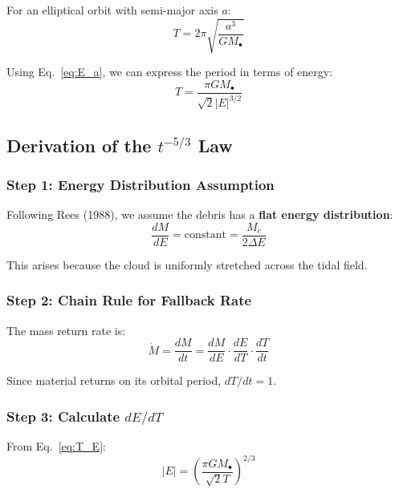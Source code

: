 \documentclass[twocolumn,amsmath,amssymb,prd,superscriptaddress,nofootinbib]{revtex4-2}
\begin{document}
For an elliptical orbit with semi-major axis $a$:
\begin{equation}
    T = 2\pi\sqrt{\frac{a^3}{GM_\bullet}}
    \label{eq:kepler}
\end{equation}

Using Eq.~\eqref{eq:E_a}, we can express the period in terms of energy:
\begin{equation}
    T = \frac{\pi GM_\bullet}{\sqrt{2}|E|^{3/2}}
    \label{eq:T_E}
\end{equation}

\subsection{Derivation of the $t^{-5/3}$ Law}
\label{sec:t53_derivation}

\subsubsection{Step 1: Energy Distribution Assumption}

Following Rees (1988), we assume the debris has a \textbf{flat energy distribution}:
\begin{equation}
    \frac{dM}{dE} = \text{constant} = \frac{M_c}{2\Delta E}
    \label{eq:dM_dE}
\end{equation}

This arises because the cloud is uniformly stretched across the tidal field.

\subsubsection{Step 2: Chain Rule for Fallback Rate}

The mass return rate is:
\begin{equation}
    \dot{M} = \frac{dM}{dt} = \frac{dM}{dE} \cdot \frac{dE}{dT} \cdot \frac{dT}{dt}
    \label{eq:chain}
\end{equation}

Since material returns on its orbital period, $dT/dt = 1$.

\subsubsection{Step 3: Calculate $dE/dT$}

From Eq.~\eqref{eq:T_E}:
\begin{equation}
    |E| = \left(\frac{\pi GM_\bullet}{\sqrt{2}T}\right)^{2/3}
\end{equation}
\end{document}
